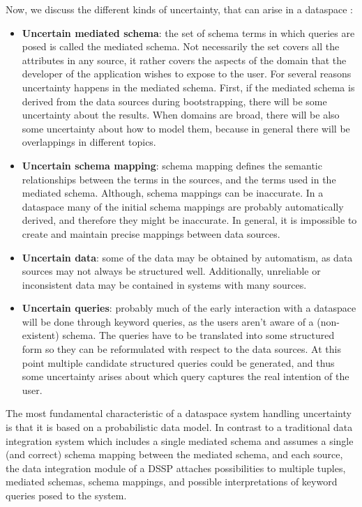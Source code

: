 Now, we discuss the different kinds of uncertainty, that can arise in a dataspace \cite[p. 123]{DBLP:conf/birthday/SarmaDH09}:

\begin{itemize}
\item \textbf{Uncertain mediated schema}: 
the set of schema terms in which queries are posed is called the mediated schema. 
Not necessarily the set covers all the attributes in any source, it  rather covers the aspects of the domain that the developer of the application wishes to expose to the user.
For several reasons uncertainty happens in the mediated schema. First, if the mediated schema is derived from the data sources during bootstrapping, there will be some uncertainty about the results. When domains are broad, there will be also some uncertainty about how to model them, because in general there will be overlappings in different topics. 

\item \textbf{Uncertain schema mapping}: schema mapping defines the semantic relationships between the terms in the sources, and the terms used in the mediated schema. Although, schema mappings can be inaccurate. 
In a dataspace many of the initial schema mappings are probably automatically derived, and therefore they might be inaccurate. 
In general, it is impossible to create and maintain precise mappings between data sources. 

\item \textbf{Uncertain data}: some of the data may be obtained by automatism, as data sources may not always be structured well. Additionally, unreliable or inconsistent data may be contained in systems with many sources.

\item \textbf{Uncertain queries}: probably much of the early interaction with a dataspace will be done through keyword queries, as the users aren't aware of a (non-existent) schema. The queries have to be translated into some structured form so they can be reformulated with respect to the data sources. At this point multiple candidate structured queries could be generated, and thus some uncertainty arises about which query captures the real intention of the user.
\end{itemize} 

The most fundamental characteristic of a dataspace system handling uncertainty is that it is based on a probabilistic data model. In contrast to a traditional data integration system which includes a single mediated schema and assumes a single (and correct) schema mapping between the mediated schema, and each source, the data integration module of a DSSP attaches possibilities to multiple tuples, mediated schemas, schema mappings, and possible interpretations of  keyword queries posed to the system. 

